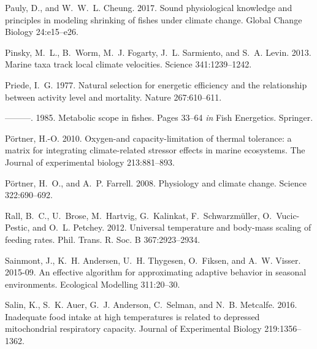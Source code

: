 \documentclass[11pt]{article}\usepackage[]{graphicx}\usepackage[]{color,soul}
\begin{document}
\begin{thebibliography}{55}
Pauly, D., and W.~W.~L. Cheung. 2017.
\newblock Sound physiological knowledge and principles in modeling shrinking of
  fishes under climate change.
\newblock Global Change Biology 24:e15--e26.

Pinsky, M.~L., B.~Worm, M.~J. Fogarty, J.~L. Sarmiento, and S.~A. Levin. 2013.
\newblock Marine taxa track local climate velocities.
\newblock Science 341:1239--1242.

Priede, I.~G. 1977.
\newblock Natural selection for energetic efficiency and the relationship
  between activity level and mortality.
\newblock Nature 267:610--611.

---{}---{}---. 1985.
\newblock Metabolic scope in fishes.
\newblock Pages 33--64 \emph{in} Fish Energetics. Springer.

P{\"o}rtner, H.-O. 2010.
\newblock Oxygen-and capacity-limitation of thermal tolerance: a matrix for
  integrating climate-related stressor effects in marine ecosystems.
\newblock The Journal of experimental biology 213:881--893.

P{\"o}rtner, H.~O., and A.~P. Farrell. 2008.
\newblock Physiology and climate change.
\newblock Science 322:690--692.

Rall, B.~C., U.~Brose, M.~Hartvig, G.~Kalinkat, F.~Schwarzmüller,
  O.~Vucic-Pestic, and O.~L. Petchey. 2012.
\newblock Universal temperature and body-mass scaling of feeding rates.
\newblock Phil. Trans. R. Soc. B 367:2923--2934.

Sainmont, J., K.~H. Andersen, U.~H. Thygesen, O.~Fiksen, and A.~W. Visser.
  2015-09.
\newblock An effective algorithm for approximating adaptive behavior in
  seasonal environments.
\newblock Ecological Modelling 311:20--30.

Salin, K., S.~K. Auer, G.~J. Anderson, C.~Selman, and N.~B. Metcalfe. 2016.
\newblock Inadequate food intake at high temperatures is related to depressed
  mitochondrial respiratory capacity.
\newblock Journal of Experimental Biology 219:1356--1362.


\end{thebibliography}
\end{document}
